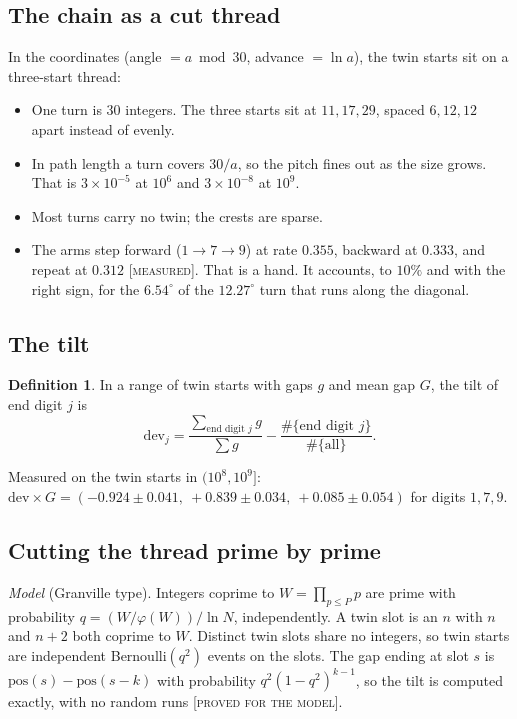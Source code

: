 \documentclass[11pt]{article}
\theoremstyle{definition}
\newtheorem{definition}{Definition}
\theoremstyle{remark}
\newcommand{\grade}[1]{\textsc{[#1]}}
\begin{document}
\subsection{The chain as a cut thread}
In the coordinates (angle $=a \bmod 30$, advance $=\ln a$), the twin starts sit on a three-start thread:
\begin{itemize}
\item One turn is $30$ integers. The three starts sit at $11,17,29$, spaced $6,12,12$ apart instead of evenly.
\item In path length a turn covers $30/a$, so the pitch fines out as the size grows. That is $3\times10^{-5}$ at $10^6$ and $3\times10^{-8}$ at $10^9$.
\item Most turns carry no twin; the crests are sparse.
\item The arms step forward ($1\to7\to9$) at rate $0.355$, backward at $0.333$, and repeat at $0.312$ \grade{measured}. That is a hand. It accounts, to $10\%$ and with the right sign, for the $6.54^\circ$ of the $12.27^\circ$ turn that runs along the diagonal.
\end{itemize}

\subsection{The tilt}
\begin{definition}
In a range of twin starts with gaps $g$ and mean gap $G$, the tilt of end digit $j$ is
\[
\mathrm{dev}_j=\frac{\sum_{\text{end digit } j} g}{\sum g}-\frac{\#\{\text{end digit } j\}}{\#\{\text{all}\}}.
\]
\end{definition}
\noindent Measured on the twin starts in $(10^8,10^9]$: $\mathrm{dev}\times G=(-0.924\pm0.041,\ +0.839\pm0.034,\ +0.085\pm0.054)$ for digits $1,7,9$.

\subsection{Cutting the thread prime by prime}
\emph{Model} (Granville type). Integers coprime to $W=\prod_{p\le P}p$ are prime with probability $q=(W/\varphi(W))/\ln N$, independently. A twin slot is an $n$ with $n$ and $n+2$ both coprime to $W$. Distinct twin slots share no integers, so twin starts are independent Bernoulli$(q^2)$ events on the slots. The gap ending at slot $s$ is $\mathrm{pos}(s)-\mathrm{pos}(s-k)$ with probability $q^2(1-q^2)^{k-1}$, so the tilt is computed exactly, with no random runs \grade{proved for the model}.
\end{document}

